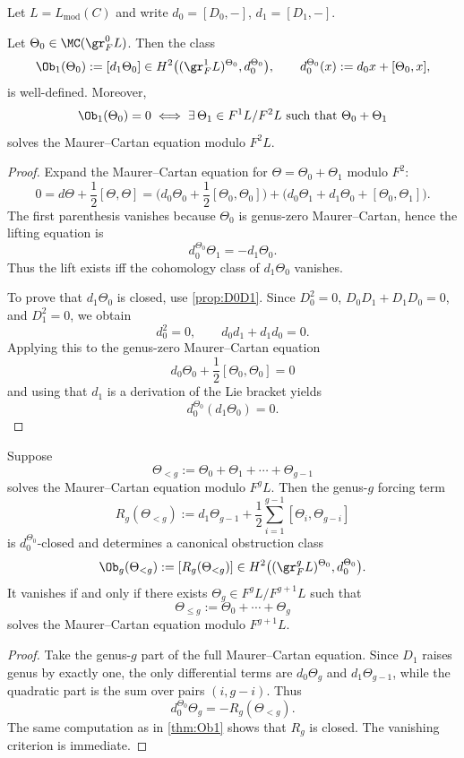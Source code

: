 Let $L=L_{\mathrm{mod}}(C)$ and write $d_0=[D_0,-]$, $d_1=[D_1,-]$.

\begin{theorem}\label{thm:Ob1}
Let $\Theta_0\in \MC(\gr_F^0L)$. Then the class
\[
\Ob_1(\Theta_0):=[d_1\Theta_0]
\in
H^2\big((\gr_F^1L)^{\Theta_0},d_0^{\Theta_0}\big),
\qquad
d_0^{\Theta_0}(x):=d_0x+[\Theta_0,x],
\]
is well-defined. Moreover,
\[
\Ob_1(\Theta_0)=0
\iff
\exists\,\Theta_1\in F^1L/F^2L
\text{ such that }
\Theta_0+\Theta_1
\]
solves the Maurer--Cartan equation modulo $F^2L$.
\end{theorem}

\begin{proof}
Expand the Maurer--Cartan equation for $\Theta=\Theta_0+\Theta_1$ modulo $F^2$:
\[
0=d\Theta+\frac12[\Theta,\Theta]
=
\Big(d_0\Theta_0+\frac12[\Theta_0,\Theta_0]\Big)
+
\Big(d_0\Theta_1+d_1\Theta_0+[\Theta_0,\Theta_1]\Big).
\]
The first parenthesis vanishes because $\Theta_0$ is genus-zero Maurer--Cartan, hence the
lifting equation is
\[
d_0^{\Theta_0}\Theta_1=-d_1\Theta_0.
\]
Thus the lift exists iff the cohomology class of $d_1\Theta_0$ vanishes.

To prove that $d_1\Theta_0$ is closed, use \cref{prop:D0D1}. Since $D_0^2=0$,
$D_0D_1+D_1D_0=0$, and $D_1^2=0$, we obtain
\[
d_0^2=0,\qquad d_0d_1+d_1d_0=0.
\]
Applying this to the genus-zero Maurer--Cartan equation
\[
d_0\Theta_0+\frac12[\Theta_0,\Theta_0]=0
\]
and using that $d_1$ is a derivation of the Lie bracket yields
\[
d_0^{\Theta_0}(d_1\Theta_0)=0.
\]
\end{proof}

\begin{theorem}\label{thm:Obg}
Suppose
\[
\Theta_{<g}:=\Theta_0+\Theta_1+\cdots+\Theta_{g-1}
\]
solves the Maurer--Cartan equation modulo $F^gL$. Then the genus-$g$ forcing term
\[
R_g(\Theta_{<g})
:=
d_1\Theta_{g-1}
+\frac12\sum_{i=1}^{g-1}[\Theta_i,\Theta_{g-i}]
\]
is $d_0^{\Theta_0}$-closed and determines a canonical obstruction class
\[
\Ob_g(\Theta_{<g})
:=
[R_g(\Theta_{<g})]
\in
H^2\big((\gr_F^gL)^{\Theta_0},d_0^{\Theta_0}\big).
\]
It vanishes if and only if there exists $\Theta_g\in F^gL/F^{g+1}L$ such that
\[
\Theta_{\le g}:=\Theta_0+\cdots+\Theta_g
\]
solves the Maurer--Cartan equation modulo $F^{g+1}L$.
\end{theorem}

\begin{proof}
Take the genus-$g$ part of the full Maurer--Cartan equation. Since $D_1$ raises genus by
exactly one, the only differential terms are $d_0\Theta_g$ and $d_1\Theta_{g-1}$, while the
quadratic part is the sum over pairs $(i,g-i)$. Thus
\[
d_0^{\Theta_0}\Theta_g=-R_g(\Theta_{<g}).
\]
The same computation as in \cref{thm:Ob1} shows that $R_g$ is closed. The vanishing
criterion is immediate.
\end{proof}


